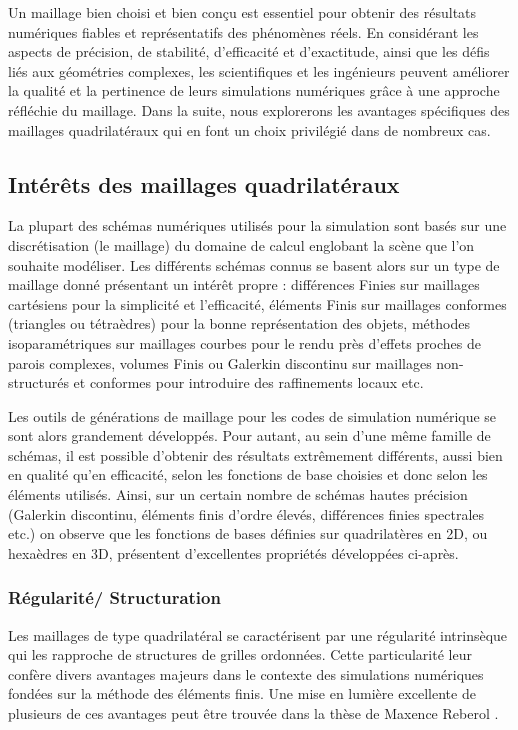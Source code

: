 Un maillage bien choisi et bien conçu est essentiel pour obtenir des résultats numériques fiables et représentatifs des phénomènes réels. En considérant les aspects de précision, de stabilité, d'efficacité et d'exactitude, ainsi que les défis liés aux géométries complexes, les scientifiques et les ingénieurs peuvent améliorer la qualité et la pertinence de leurs simulations numériques grâce à une approche réfléchie du maillage. Dans la suite, nous explorerons les avantages spécifiques des maillages quadrilatéraux qui en font un choix privilégié dans de nombreux cas.

\subsection{Intérêts des maillages quadrilatéraux}

La plupart des schémas numériques utilisés pour la simulation sont basés sur une discrétisation (le maillage) du domaine de calcul englobant la scène que l'on souhaite modéliser. Les différents schémas connus se basent alors sur un type de maillage donné présentant un intérêt propre : différences Finies sur maillages cartésiens pour la simplicité et l'efficacité, éléments Finis sur maillages conformes (triangles ou tétraèdres) pour la bonne représentation des objets, méthodes isoparamétriques sur maillages courbes pour le rendu près d'effets proches de parois complexes, volumes Finis ou Galerkin discontinu sur maillages non-structurés et conformes pour introduire des raffinements locaux etc.

Les outils de générations de maillage pour les codes de simulation numérique se sont alors grandement développés. Pour autant, au sein d'une même famille de schémas, il est possible d'obtenir des résultats extrêmement différents, aussi bien en qualité qu'en efficacité, selon les fonctions de base choisies et donc selon les éléments utilisés. Ainsi, sur un certain nombre de schémas hautes précision (Galerkin discontinu, éléments finis d'ordre élevés, différences finies spectrales etc.) on observe que les fonctions de bases définies sur quadrilatères en 2D, ou hexaèdres en 3D, présentent d'excellentes propriétés développées ci-après.

\subsubsection{Régularité/ Structuration}

Les maillages de type quadrilatéral se caractérisent par une régularité intrinsèque qui les rapproche de structures de grilles ordonnées. Cette particularité leur confère divers avantages majeurs dans le contexte des simulations numériques fondées sur la méthode des éléments finis. Une mise en lumière excellente de plusieurs de ces avantages peut être trouvée dans la thèse de Maxence Reberol \cite{reberol2018maillages}.

